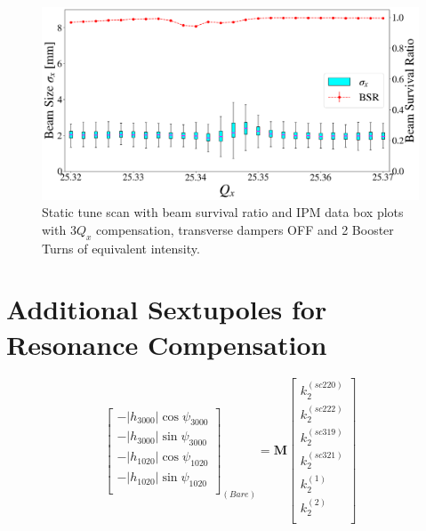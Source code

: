 \begin{figure}[H]
    \centering
    \includegraphics[width=\columnwidth]{chapter6/static2turns_ipm_dampersOFF.png}
    \caption{Static tune scan with beam survival ratio and IPM data box plots with $3Q_x$ compensation, transverse dampers OFF and 2 Booster Turns of equivalent intensity.}
    \label{fig:static2_dampersOFF}
\end{figure}

\section{Additional Sextupoles for Resonance Compensation}
\label{sec:addsexts}

\begin{equation}
    \begin{bmatrix}
        -|h_{3000}| \cos \psi_{3000} \\
        -|h_{3000}| \sin \psi_{3000} \\
        -|h_{1020}| \cos \psi_{1020} \\
        -|h_{1020}| \sin \psi_{1020} \\
        \end{bmatrix}_{(Bare)}
         =
        \boldsymbol{M}
        \begin{bmatrix}
        k_2^{(sc220)} \\
        k_2^{(sc222)}\\
        k_2^{(sc319)} \\
        k_2^{(sc321)}\\
        k_2^{(1)} \\
        k_2^{(2)}\\
        \end{bmatrix}
\end{equation}

